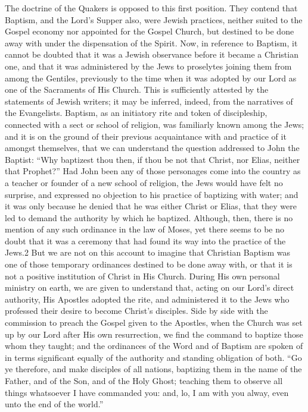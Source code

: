 \documentclass[]{book}
\begin{document}
The doctrine of the Quakers is opposed to this first position. They contend that Baptism, and the Lord's Supper also, were Jewish practices, neither suited to the Gospel economy nor appointed for the Gospel Church, but destined to be done away with under the dispensation of the Spirit. Now, in reference to Baptism, it cannot be doubted that it was a Jewish observance before it became a Christian one, and that it was administered by the Jews to proselytes joining them from among the Gentiles, previously to the time when it was adopted by our Lord as one of the Sacraments of His Church. This is sufficiently attested by the statements of Jewish writers; it may be inferred, indeed, from the narratives of the Evangelists. Baptism, as an initiatory rite and token of discipleship, connected with a sect or school of religion, was familiarly known among the Jews; and it is on the ground of their previous acquaintance with and practice of it amongst themselves, that we can understand the question addressed to John the Baptist: ``Why baptizest thou then, if thou be not that Christ, nor Elias, neither that Prophet?'' Had John been any of those personages come into the country as a teacher or founder of a new school of religion, the Jews would have felt no surprise, and expressed no objection to his practice of baptizing with water; and it was only because he denied that he was either Christ or Elias, that they were led to demand the authority by which he baptized. Although, then, there is no mention of any such ordinance in the law of Moses, yet there seems to be no doubt that it was a ceremony that had found its way into the practice of the Jews.2 But we are not on this account to imagine that Christian Baptism was one of those temporary ordinances destined to be done away with, or that it is not a positive institution of Christ in His Church. During His own personal ministry on earth, we are given to understand that, acting on our Lord's direct authority, His Apostles adopted the rite, and administered it to the Jews who professed their desire to become Christ's disciples. Side by side with the commission to preach the Gospel given to the Apostles, when the Church was set up by our Lord after His own resurrection, we find the command to baptize those whom they taught; and the ordinances of the Word and of Baptism are spoken of in terms significant equally of the authority and standing obligation of both. ``Go ye therefore, and make disciples of all nations, baptizing them in the name of the Father, and of the Son, and of the Holy Ghost; teaching them to observe all things whatsoever I have commanded you: and, lo, I am with you alway, even unto the end of the world.''
\end{document}
